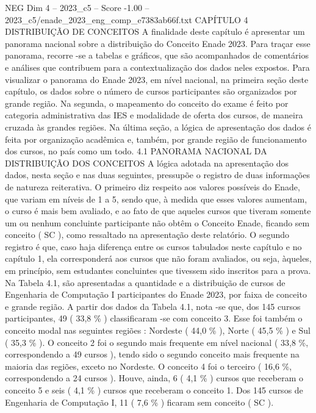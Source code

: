 \begin{textsample}{NEG Dim 4 – 2023\_c5 – Score -1.00 – 2023\_c5/enade\_2023\_eng\_comp\_e7383ab66f.txt}  \label{ex:f4_neg_091}
CAPÍTULO 4 DISTRIBUIÇÃO DE CONCEITOS A finalidade deste capítulo é apresentar um panorama nacional sobre a distribuição do Conceito Enade 2023.
Para traçar esse panorama, recorre -se a tabelas e gráficos, que são acompanhados de comentários e análises que contribuem para a contextualização dos dados neles expostos.
Para visualizar o panorama do Enade 2023, em nível nacional, na primeira seção deste capítulo, os dados sobre o número de cursos participantes são organizados por grande região.
Na segunda, o mapeamento do conceito do exame é feito por categoria administrativa das IES e modalidade de oferta dos cursos, de maneira cruzada às grandes regiões.
Na última seção, a lógica de apresentação dos dados é feita por organização acadêmica e, também, por grande região de funcionamento dos cursos, no país como um todo. 4.1 PANORAMA NACIONAL DA DISTRIBUIÇÃO DOS CONCEITOS A lógica adotada na apresentação dos dados, nesta seção e nas duas seguintes, pressupõe o registro de duas informações de natureza reiterativa.
O primeiro diz respeito aos valores possíveis do Enade, que variam em níveis de 1 a 5, sendo que, à medida que esses valores aumentam, o curso é mais bem avaliado, e ao fato de que aqueles cursos que tiveram somente um ou nenhum concluinte participante não obtêm o Conceito Enade, ficando sem conceito ( SC ), como ressaltado na apresentação deste relatório.
O segundo registro é que, caso haja diferença entre os cursos tabulados neste capítulo e no capítulo 1, ela corresponderá aos cursos que não foram avaliados, ou seja, àqueles, em princípio, sem estudantes concluintes que tivessem sido inscritos para a prova.
Na Tabela 4.1, são apresentadas a quantidade e a distribuição de cursos de Engenharia de Computação I participantes do Enade 2023, por faixa de conceito e grande região.
A partir dos dados da Tabela 4.1, nota -se que, dos 145 cursos participantes, 49 ( 33,8 \% ) classificaram -se com conceito 3.
Esse foi também o conceito modal nas seguintes regiões : Nordeste ( 44,0 \% ), Norte ( 45,5 \% ) e Sul ( 35,3 \% ).
O conceito 2 foi o segundo mais frequente em nível nacional ( 33,8 \%, correspondendo a 49 cursos ), tendo sido o segundo conceito mais frequente na maioria das regiões, exceto no Nordeste.
O conceito 4 foi o terceiro ( 16,6 \%, correspondendo a 24 cursos ).
Houve, ainda, 6 ( 4,1 \% ) cursos que receberam o conceito 5 e seis ( 4,1 \% ) cursos que receberam o conceito 1.
Dos 145 cursos de Engenharia de Computação I, 11 ( 7,6 \% ) ficaram sem conceito ( SC ).

\end{textsample}
